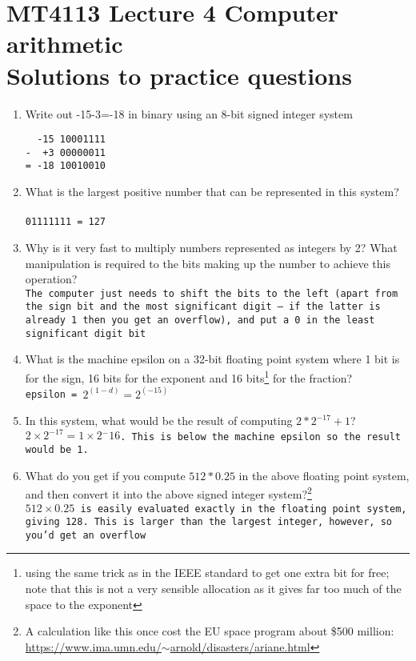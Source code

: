 \documentclass[11pt,a4paper]{article}
\begin{document}
\section*{MT4113 Lecture 4 Computer arithmetic\\Solutions to practice questions} 

\begin{enumerate}
    \item Write out -15-3=-18 in binary using an 8-bit signed integer system
\begin{verbatim}  -15 10001111
-  +3 00000011
= -18 10010010
\end{verbatim}		
    \item What is the largest positive number that can be represented in this system?\\ \\
\texttt{01111111 = 127}
    \item Why is it very fast to multiply numbers represented as integers by 2?  What manipulation is required to the bits making up the number to achieve this operation?\\

\texttt{The computer just needs to shift the bits to the left (apart from the sign bit and the most significant digit -- if the latter is already 1 then you get an overflow), and put a 0 in the least significant digit bit}

    \item What is the machine epsilon on a 32-bit floating point system where 1 bit is for the sign, 16 bits for the exponent and 16 bits\footnote{using the same trick as in the IEEE standard to get one extra bit for free; note that this is not a very sensible allocation as it gives far too much of the space to the exponent} for the fraction?\\
		
\texttt{epsilon = $2^{(1-d)}=2^{(-15)}$}

    \item In this system, what would be the result of computing $2* 2^{-17} + 1$?\\
		
\texttt{$2\times2^{-17} = 1\times2{^-16}$.  This is below the machine epsilon so the result would be 1.}

    \item What do you get if you compute $512 * 0.25$ in the above floating point system, and then convert it into the above signed integer system?\footnote{A calculation like this once cost the EU space program about \$500 million: \href{https://www.ima.umn.edu/~arnold/disasters/ariane.html}{https://www.ima.umn.edu/$\sim$arnold/disasters/ariane.html}}\\
		
\texttt{$512 \times 0.25$ is easily evaluated exactly in the floating point system, giving 128.  This is larger than the largest integer, however, so you'd get an overflow}

\end{enumerate}
\end{document}
